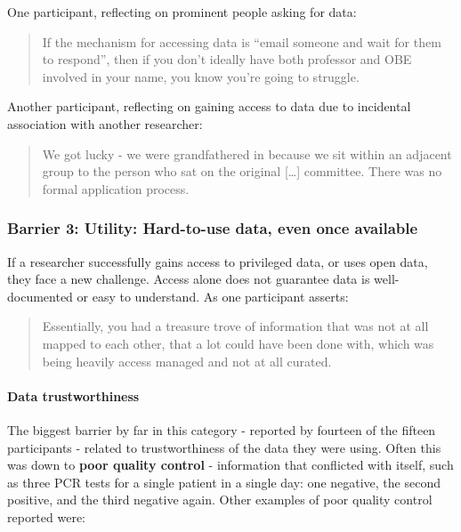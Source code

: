 \documentclass{CUP-JNL-DAP}%
\begin{document}
One participant, reflecting on prominent people asking for data: 

\blockquote{If the mechanism for accessing data is \enquote{email someone and wait for them to respond}, then if you don't ideally have both professor and OBE involved in your name, you know you're going to struggle.}

Another participant, reflecting on gaining access to data due to incidental association with another researcher: 

\blockquote{We got lucky - we were grandfathered in because we sit within an adjacent group to the person who sat on the original […] committee. There was no formal application process.}

\subsubsection{Barrier 3: Utility: Hard-to-use data, even once available}
If a researcher successfully gains access to privileged data, or uses open data, they face a new challenge. Access alone does not guarantee data is well-documented or easy to understand. As one participant asserts: 

\blockquote{Essentially, you had a treasure trove of information that was not at all mapped to each other, that a lot could have been done with, which was being heavily access managed and not at all curated.}

\paragraph{Data trustworthiness} 

The biggest barrier by far in this category - reported by fourteen of the fifteen participants - related to trustworthiness of the data they were using. Often this was down to \textbf{poor quality control} - information that conflicted with itself, such as three PCR tests for a single patient in a single day: one negative, the second positive, and the third negative again. Other examples of poor quality control reported were:
\end{document}
